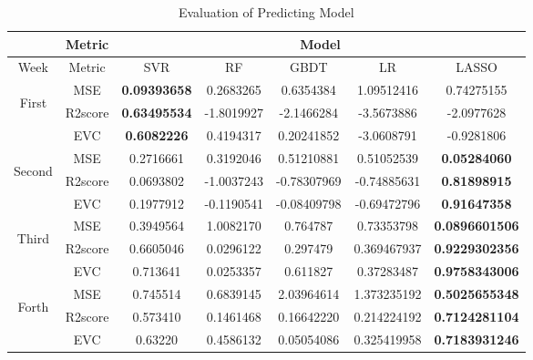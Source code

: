 \begin{table*}[!htbp]
\centering
\begin{tabular}{|c|c|c|c|c|c|c|}
 \hline
    \multicolumn{1}{|c|}{\textbf{}}&
    \multicolumn{1}{|c|}{\textbf{\large Metric}}&
    \multicolumn{5}{|c|}{\textbf{\large Model}} \\
 \hline
    Week & Metric & SVR &  RF &  GBDT &  LR & LASSO\\
 \hline
    \multirow{3}{*}{\begin{sideways}{First}\end{sideways}}
    & MSE  & \textbf{0.09393658} &  0.2683265 & 0.6354384 & 1.09512416 & 0.74275155  \\
    & R2score & \textbf{0.63495534} &  -1.8019927	& -2.1466284 & -3.5673886 & -2.0977628   \\
    & EVC  & \textbf{0.6082226} & 0.4194317 & 0.20241852 & -3.0608791 & -0.9281806   \\
 \hline
     \multirow{3}{*}{\begin{sideways}{Second}\end{sideways}}
    & MSE  & 0.2716661 & 0.3192046 & 0.51210881 & 0.51052539 & \textbf{0.05284060}  \\
    & R2score & 0.0693802 & -1.0037243 & -0.78307969 & -0.74885631 & \textbf{0.81898915}   \\
    & EVC  & 0.1977912 & -0.1190541 & -0.08409798 & -0.69472796 & \textbf{0.91647358}   \\
 \hline
     \multirow{3}{*}{\begin{sideways}{Third}\end{sideways}}
    & MSE  & 0.3949564 &1.0082170 &0.764787 &0.73353798 &\textbf{0.0896601506}  \\
    & R2score & 0.6605046 &0.0296122 &0.297479 &0.369467937 &\textbf{0.9229302356}   \\
    & EVC  & 0.713641 &0.0253357 &0.611827 &0.37283487 &\textbf{0.9758343006}  \\
 \hline
      \multirow{3}{*}{\begin{sideways}{Forth}\end{sideways}}
    & MSE  &0.745514&0.6839145&2.03964614&1.373235192&\textbf{0.5025655348}  \\
    & R2score &0.573410&0.1461468&0.16642220&0.214224192&\textbf{0.7124281104}   \\
    & EVC  &0.63220&0.4586132&0.05054086&0.325419958&\textbf{0.7183931246}  \\
 \hline
\end{tabular}
\caption{Evaluation of Predicting Model}
\label{tab:evalution}
\end{table*}
